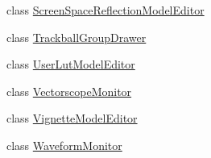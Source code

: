 \begin{DoxyCompactItemize}
\item 
class \hyperlink{class_unity_editor_1_1_post_processing_1_1_screen_space_reflection_model_editor}{Screen\+Space\+Reflection\+Model\+Editor}
\item 
class \hyperlink{class_unity_editor_1_1_post_processing_1_1_trackball_group_drawer}{Trackball\+Group\+Drawer}
\item 
class \hyperlink{class_unity_editor_1_1_post_processing_1_1_user_lut_model_editor}{User\+Lut\+Model\+Editor}
\item 
class \hyperlink{class_unity_editor_1_1_post_processing_1_1_vectorscope_monitor}{Vectorscope\+Monitor}
\item 
class \hyperlink{class_unity_editor_1_1_post_processing_1_1_vignette_model_editor}{Vignette\+Model\+Editor}
\item 
class \hyperlink{class_unity_editor_1_1_post_processing_1_1_waveform_monitor}{Waveform\+Monitor}
\end{DoxyCompactItemize}
